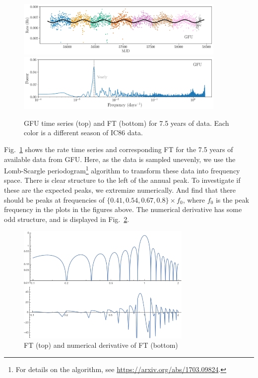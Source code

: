 \begin{figure}
    \centering
    \includegraphics[width=0.9\textwidth]{images/gfu_online_overall_with_model.png}
    \includegraphics[width=0.9\textwidth]{images/gfu_online_overall_FFT_maxima_False.png}
    \caption{GFU time series (top) and FT (bottom) for 7.5 years of data. Each color is a different season of IC86 data.}
    \label{fig:gfu_7_year_fft}
\end{figure}

Fig.~\ref{fig:gfu_7_year_fft} shows the rate time series and corresponding FT for the 7.5 years of available data from GFU. Here, as the data is sampled unevenly, we use the Lomb-Scargle periodogram\footnote{For details on the algorithm, see \url{https://arxiv.org/abs/1703.09824}.} algorithm to transform these data into frequency space. There is clear structure to the left of the annual peak. To investigate if these are the expected peaks, we extremize numerically. And find that there should be peaks at frequencies of $\{0.41,0.54,0.67,0.8\}\times f_0$, where $f_0$ is the peak frequency in the plots in the figures above. The numerical derivative has some odd structure, and is displayed in Fig.~\ref{fig:fft_derivative}.

\begin{figure}
    \centering
    \includegraphics[width=0.75\textwidth]{images/GFU_fft_with_derivative.png}
    \caption{FT (top) and numerical derivative of FT (bottom)}
    \label{fig:fft_derivative}
\end{figure}

